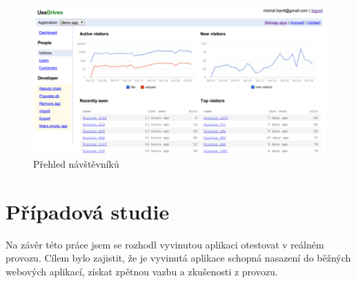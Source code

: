 \documentclass[bc,male,java,dept456]{diploma}						%
\begin{document}

\begin{figure}[h]
	\centering
	\includegraphics[width=15cm]{img/ud_visitors_2.pdf}
	\caption{Přehled návštěvníků}
	\label{img:ud_dashboard}
\end{figure}














\section{Případová studie}

Na závěr této práce jsem se rozhodl vyvinutou aplikaci otestovat v reálném provozu. Cílem bylo zajistit, že je vyvinutá aplikace schopná nasazení do běžných webových aplikací, získat zpětnou vazbu a zkušenosti z provozu. 
\end{document}
